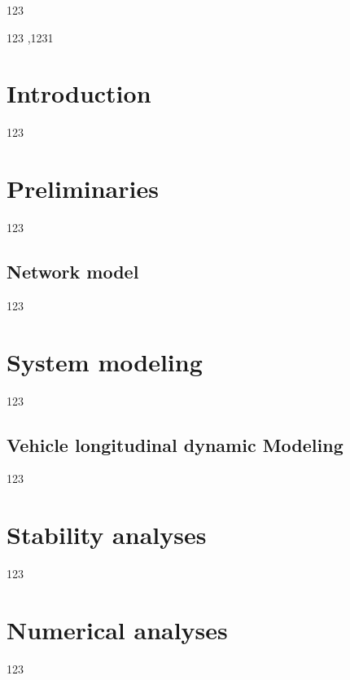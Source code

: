 \documentclass[a4paper]{cas-sc}
\begin{document}
\begin{highlights}

  \item 123
\end{highlights}

\begin{keywords}
  123 \sep 1231
\end{keywords}


\maketitle

\section{Introduction}
\label{Section 1}
123\citep{Gu2003}

\section{Preliminaries}
\label{Section 2}
123
\subsection{Network model}
\label{Section 2.1}
123
\section{System modeling}
\label{Section 3}
123


\subsection{Vehicle longitudinal dynamic Modeling}
\label{Section 3.1}
123


\section{Stability analyses}
\label{Section 4}
123
\section{Numerical analyses}
\label{Section 5}
123
\end{document}
